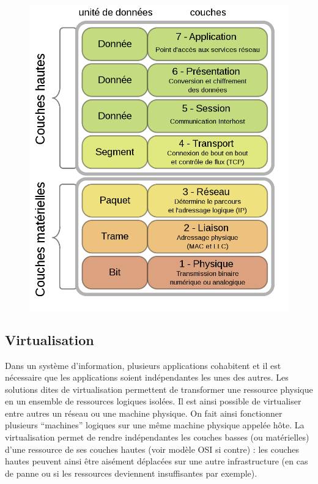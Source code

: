 \documentclass[11pt,fleqn]{book} %
\begin{document}
\begin{figure}
    \renewcommand{\figurename}{Diagramme}
    \includegraphics[scale=0.2]{Pictures/OSI.png}
\end{figure}
\subsection{Virtualisation}
Dans un système d'information, plusieurs applications cohabitent et il est nécessaire que les applications soient indépendantes les unes des autres. Les solutions dites de virtualisation permettent de transformer une ressource physique en un ensemble de ressources logiques isolées. Il est ainsi possible de virtualiser entre autres un réseau ou une machine physique. On fait ainsi fonctionner plusieurs “machines” logiques sur une même machine physique appelée hôte. La virtualisation permet de rendre indépendantes les couches basses (ou matérielles) d’une ressource de ses couches hautes (voir modèle OSI si contre) : les couches hautes peuvent ainsi être aisément déplacées sur une autre infrastructure (en cas de panne ou si les ressources deviennent insuffisantes par exemple).
\end{document}
